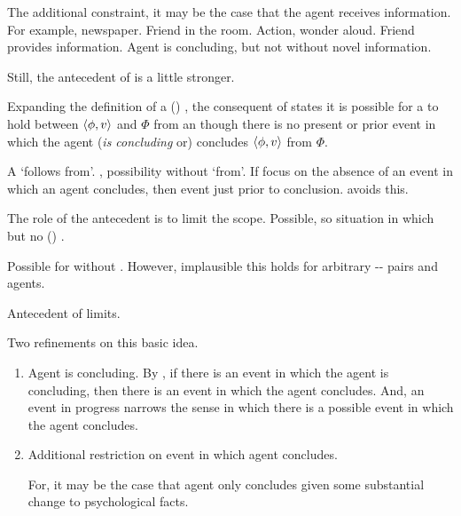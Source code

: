 \begin{note}
  The additional constraint, it may be the case that the agent receives information.
  For example, newspaper.
  Friend in the room.
  Action, wonder aloud.
  Friend provides information.
  Agent is concluding, but not without novel information.
  
  


  Still, the antecedent of \supportII{} is a little stronger.








  Expanding the definition of a (\pwP{}) \wit{}, the consequent of \supportII{} states it is possible for a \ros{} to hold between \(\langle \phi, v \rangle\) and \(\Phi\) from an  though there is no present or prior event in which the agent (\emph{is concluding} or) concludes \(\langle \phi, v \rangle\) from \(\Phi\).

  A \ros{} `follows from'.
  \supportII{}, possibility without `from'.
  If focus on the absence of an event in which an agent concludes, then event just prior to conclusion.
  \pwit{} avoids this.

  The role of the antecedent is to limit the scope.
  Possible, so situation in which \ros{} but no (\pwP{}) \wit{}.
\end{note}

\begin{note}
  Possible for \ros{} without \wit{}.
  However, implausible this holds for arbitrary -- pairs and agents.

  Antecedent of \supportII{} limits.
\end{note}

\begin{note}
  Two refinements on this basic idea.

  \begin{enumerate}
  \item
    Agent is concluding.
    By \assuPP{}, if there is an event in which the agent is concluding, then there is an event in which the agent concludes.
    And, an event in progress narrows the sense in which there is a possible event in which the agent concludes.
  \item
    Additional restriction on event in which agent concludes.

    For, it may be the case that agent only concludes given some substantial change to psychological facts.
  \end{enumerate}
\end{note}


